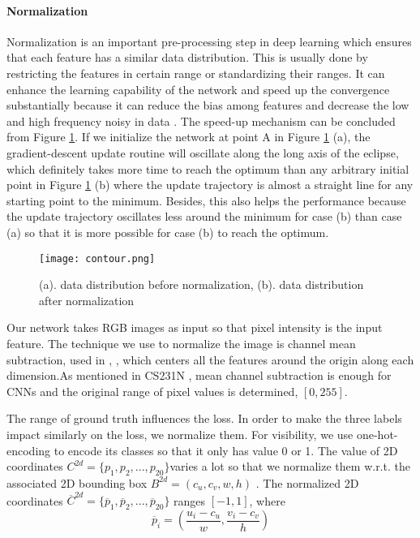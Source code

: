 \paragraph{Normalization}
Normalization is an important pre-processing step in deep learning which ensures that each feature has a similar data distribution. This is usually done by restricting the features in certain range or standardizing their ranges. It can enhance the learning capability of the network and speed up the convergence substantially  because it can reduce the bias among features and decrease the low and high frequency noisy in data \cite{Jayalakshmi2011}. The speed-up mechanism can be concluded from Figure \ref{figure:contour}. If we initialize the network at point A in Figure \ref{figure:contour} (a), the gradient-descent update routine will oscillate along the long axis of the eclipse, which definitely takes more time to reach the optimum than any arbitrary initial point in Figure \ref{figure:contour} (b) where the update trajectory is almost a straight line for any starting point  to the minimum. Besides, this also helps the performance because the update trajectory oscillates less around the minimum for case (b) than case (a) so that it is more possible for case (b) to reach the optimum.

\begin{figure}[h]		
	\texttt{[image: contour.png]}
	\caption{(a). data distribution before normalization, (b). data distribution after normalization}
	\centering
	\label{figure:contour}
\end{figure}

Our network takes RGB images as input so that pixel intensity is the input feature. The technique we use to normalize the image is channel mean subtraction, used in \cite{DBLP:journals/corr/SimonyanZ14a}, \cite{DBLP:journals/corr/GirshickDDM13}, which centers all the features around the origin along each dimension.As mentioned in CS231N \cite{CS231N}, mean channel subtraction is enough for CNNs and the original range of pixel values is determined, \ie $[0, 255]$.

The range of ground truth influences the loss. In order to make the three labels impact similarly on the loss, we normalize them. For visibility, we use one-hot-encoding \cite{One-hot} to encode its classes so that it only has value 0 or 1. The value of 2D coordinates $C^{2d}  = \{p_1, p_2, ...,p_{20}\}$varies a lot so that we normalize them w.r.t. the associated 2D bounding box $B^{2d} = (c_u, c_v, w, h)$ \cite{DBLP:journals/corr/ChabotCRTC17}. The normalized 2D coordinates $\overline{C}^{2d}  = \{\overline{p}_1, \overline{p}_2, ...,\overline{p}_{20}\}$ ranges $[-1, 1]$, where
\begin{equation}
\overline{p}_i  = (\frac{u_i - c_u}{w}, \frac{v_i - c_v}{h})
\end{equation}

